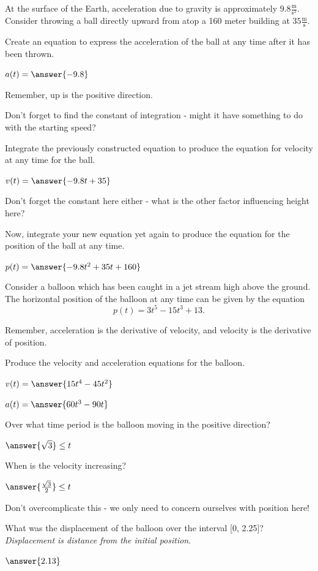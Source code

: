 \documentclass{ximera}
\begin{document}
\begin{question}
At the surface of the Earth, acceleration due to gravity is approximately $9.8 \frac{\text{m}}{\text{s}^2}$. Consider throwing a ball directly upward from atop a 160 meter building at $35 \frac{\text{m}}{\text{s}}$.

Create an equation to express the acceleration of the ball at any time after it has been thrown.

$a(t) = \answer{-9.8}$
\begin{feedback}
Remember, up is the positive direction.
\end{feedback}

\begin{hint}
Don't forget to find the constant of integration - might it have something to do with the starting speed?
\end{hint}
Integrate the previously constructed equation to produce the equation for velocity at any time for the ball.

$v(t) = \answer{-9.8t+35}$

\begin{hint}
Don't forget the constant here either - what is the other factor influencing height here?
\end{hint}
Now, integrate your new equation yet again to produce the equation for the position of the ball at any time.

$p(t) = \answer{-9.8t^2+35t+160}$
\end{question}
\begin{question}
Consider a balloon which has been caught in a jet stream high above the ground. The horizontal position of the balloon at any time can be given by the equation $$p(t) = 3t^5-15t^3+13\text{.}$$

\begin{hint}
Remember, acceleration is the derivative of velocity, and velocity is the derivative of position.
\end{hint}
Produce the velocity and acceleration equations for the balloon.

$v(t) = \answer{15t^4-45t^2}$

$a(t) = \answer{60t^3-90t}$

Over what time period is the balloon moving in the positive direction?

$\answer{\sqrt{3}} \leq t$

When is the velocity increasing?

$\answer{\frac{\sqrt{3}}{2}} \leq t$

\begin{hint}
Don't overcomplicate this - we only need to concern ourselves with position here!
\end{hint}
What was the displacement of the balloon over the interval [0, 2.25]? \textit{Displacement is distance from the initial position}.

$\answer{2.13}$
\end{question}
\end{document}
